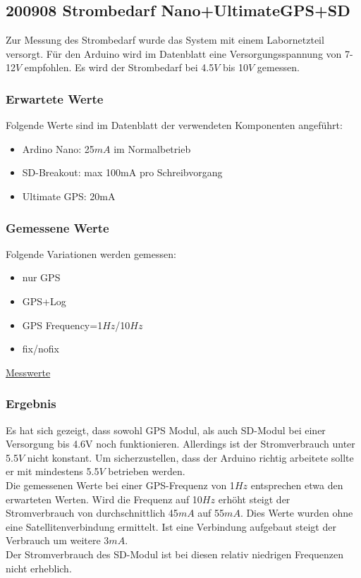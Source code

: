 \documentclass{article}
\begin{document}
\subsection{200908 Strombedarf Nano+UltimateGPS+SD}
Zur Messung des Strombedarf wurde das System mit einem Labornetzteil versorgt. Für den Arduino wird im Datenblatt eine Versorgungsspannung von 7-12$V$ empfohlen. Es wird der Strombedarf bei 4.5$V$ bis 10$V$ gemessen.\\
\subsubsection{Erwartete Werte}
Folgende Werte sind im Datenblatt der verwendeten Komponenten angeführt:
\begin{itemize}
\item
Ardino Nano: 25$mA$ im Normalbetrieb
\item
SD-Breakout: max 100mA pro Schreibvorgang
\item
Ultimate GPS: 20mA
\end{itemize}

\subsubsection{Gemessene Werte}
Folgende Variationen werden gemessen:
\begin{itemize}
\item{nur GPS}
\item{GPS+Log}
\item{GPS Frequency=1$Hz$/10$Hz$}
\item{fix/nofix}
\end{itemize}

\href{D:/Dropbox/Masterarbeit AvaRange GPS/Dokumentation/Strommessung.txt}{Messwerte}
\subsubsection{Ergebnis}

Es hat sich gezeigt, dass sowohl GPS Modul, als auch SD-Modul bei einer Versorgung bis 4.6V noch funktionieren. Allerdings ist der Stromverbrauch unter 5.5$V$ nicht konstant. Um sicherzustellen, dass der Arduino richtig arbeitete sollte er mit mindestens 5.5$V$ betrieben werden.\\
Die gemessenen Werte bei einer GPS-Frequenz von 1$Hz$ entsprechen etwa den erwarteten Werten. Wird die Frequenz auf 10$Hz$ erhöht steigt der Stromverbrauch von durchschnittlich 45$mA$ auf 55$mA$. Dies Werte wurden ohne eine Satellitenverbindung ermittelt. Ist eine Verbindung aufgebaut steigt der Verbrauch um weitere 3$mA$.\\
Der Stromverbrauch des SD-Modul ist bei diesen relativ niedrigen Frequenzen nicht erheblich.
\end{document}
